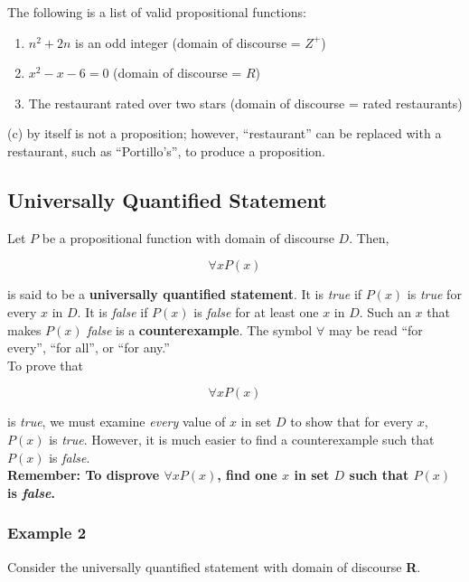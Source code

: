 The following is a list of valid propositional functions:

\begin{enumerate}[label=(\alph*)]
\item $n^2 + 2n$ is an odd integer (domain of discourse = $Z^+$)
\item $x^2 - x - 6 = 0$ (domain of discourse = $R$)
\item The restaurant rated over two stars (domain of discourse = rated restaurants)
\end{enumerate}

(c) by itself is not a proposition; however, ``restaurant'' can be replaced with a restaurant, such as ``Portillo's'', to produce a proposition.

\subsection*{Universally Quantified Statement}

Let $P$ be a propositional function with domain of discourse $D$.  Then,

\[
    \forall x P(x)
\]

is said to be a \textbf{universally quantified statement}.  It is \textit{true} if $P(x)$ is \textit{true} for every $x$ in $D$.  It is \textit{false} if $P(x)$ is \textit{false} for at least one $x$ in $D$.  Such an $x$ that makes $P(x)$ \textit{false} is a \textbf{counterexample}.  The symbol $\forall$ may be read ``for every'', ``for all'', or ``for any.''\\

To prove that

\[
    \forall x P(x)
\]

is \textit{true}, we must examine \textit{every} value of $x$ in set $D$ to show that for every $x$, $P(x)$ is \textit{true}.  However, it is much easier to find a counterexample such that $P(x)$ is \textit{false}.\\

\textbf{Remember: To disprove $\forall x P(x)$, find one $x$ in set $D$ such that $P(x)$ is \textit{false}.}

\subsubsection*{Example 2}

Consider the universally quantified statement with domain of discourse \textbf{R}.

